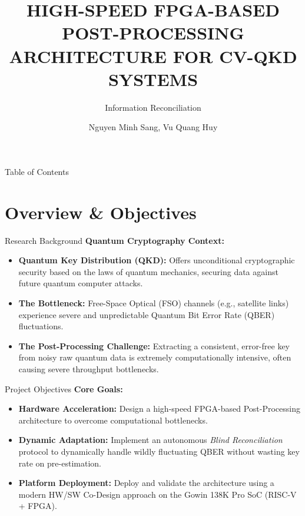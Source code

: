 \documentclass[t, aspectratio=169]{beamer}
\title{HIGH-SPEED FPGA-BASED POST-PROCESSING ARCHITECTURE FOR CV-QKD SYSTEMS}
\subtitle{Information Reconciliation}
\author{Nguyen Minh Sang, Vu Quang Huy}
\institute{Project Report}
\begin{document}
	
	\husttitlepage
	
	\begin{frame}[allowframebreaks]{Table of Contents}
		\tableofcontents[hideallsubsections]
	\end{frame}
	
	\resetPageCount  
	\showPageNumber  
	
	\useStyleHustFull
	\useThinBar 
	
	\section{Overview \& Objectives}
	
	\begin{frame}{Research Background}
        \textbf{Quantum Cryptography Context:}
        \begin{itemize}
            \item \textbf{Quantum Key Distribution (QKD):} Offers unconditional cryptographic security based on the laws of quantum mechanics, securing data against future quantum computer attacks.
            \vspace{0.8em}
            \item \textbf{The Bottleneck:} Free-Space Optical (FSO) channels (e.g., satellite links) experience severe and unpredictable Quantum Bit Error Rate (QBER) fluctuations.
            \vspace{0.8em}
            \item \textbf{The Post-Processing Challenge:} Extracting a consistent, error-free key from noisy raw quantum data is extremely computationally intensive, often causing severe throughput bottlenecks.
        \end{itemize}
	\end{frame}

	\begin{frame}{Project Objectives}
        \textbf{Core Goals:}
        \begin{itemize}
            \item \textbf{Hardware Acceleration:} Design a high-speed FPGA-based Post-Processing architecture to overcome computational bottlenecks.
            \vspace{0.8em}
            \item \textbf{Dynamic Adaptation:} Implement an autonomous \textit{Blind Reconciliation} protocol to dynamically handle wildly fluctuating QBER without wasting key rate on pre-estimation.
            \vspace{0.8em}
            \item \textbf{Platform Deployment:} Deploy and validate the architecture using a modern HW/SW Co-Design approach on the Gowin 138K Pro SoC (RISC-V + FPGA).
        \end{itemize}
	\end{frame}
	
\end{document}

